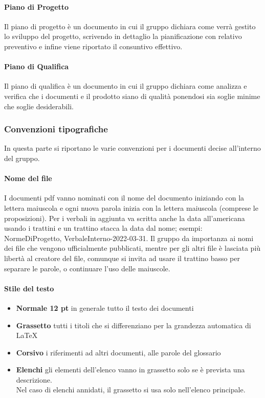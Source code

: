 \paragraph{Piano di Progetto}
Il piano di progetto è un documento in cui il gruppo dichiara come verrà gestito lo sviluppo del progetto,
scrivendo in dettaglio la pianificazione con relativo preventivo e infine viene riportato il consuntivo effettivo.

\paragraph{Piano di Qualifica}
Il piano di qualifica è un documento in cui il gruppo dichiara come analizza e verifica che i documenti e 
il prodotto siano di qualità ponendosi sia soglie minime che soglie desiderabili.

\subsubsection{Convenzioni tipografiche}
In questa parte si riportano le varie convenzioni per i documenti decise all'interno del gruppo.
\paragraph{Nome del file}
I documenti pdf vanno nominati con il nome del documento iniziando con la lettera maiuscola 
e ogni nuova parola inizia con la lettera maiuscola (comprese le proposizioni). Per i verbali in 
aggiunta va scritta anche la data all'americana usando i trattini e un trattino stacca la data 
dal nome; esempi: NormeDiProgetto, VerbaleInterno-2022-03-31. \newline
Il gruppo da importanza ai nomi dei file che vengono ufficialmente pubblicati, mentre per gli altri 
file è lasciata più libertà al creatore del file, comunque si invita ad usare il trattino basso per 
separare le parole, o continuare l'uso delle maiuscole.

\paragraph{Stile del testo}
\begin{itemize}
        \item \textbf{Normale 12 pt} in generale tutto il testo dei documenti
        \item \textbf{Grassetto} tutti i titoli che si differenziano per la grandezza automatica di \LaTeX
        \item \textbf{Corsivo} i riferimenti ad altri documenti, alle parole del glossario
        \item \textbf{Elenchi} gli elementi dell'elenco vanno in grassetto solo se è prevista una descrizione. \\
                                Nel caso di elenchi annidati, il grassetto si usa solo nell'elenco principale.
\end{itemize}

